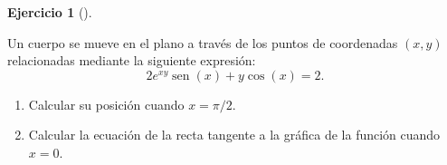 \documentclass[
  a4paper,
]{scrreport}
\providecommand{\tightlist}{%
  \setlength{\itemsep}{0pt}\setlength{\parskip}{0pt}}\usepackage{longtable,booktabs,array}
\theoremstyle{definition}
\newtheorem{exercise}{Ejercicio}[chapter]
\theoremstyle{remark}
\begin{document}
\begin{exercise}[]\protect\hypertarget{exr-derivada-implicita-3}{}\label{exr-derivada-implicita-3}

Un cuerpo se mueve en el plano a través de los puntos de coordenadas
\((x,y)\) relacionadas mediante la siguiente expresión: \[
2e^{xy} \operatorname{sen}(x) + y\cos(x) = 2.
\]

\begin{enumerate}
\def\labelenumi{\alph{enumi}.}
\tightlist
\item
  Calcular su posición cuando \(x=\pi/2\).
\item
  Calcular la ecuación de la recta tangente a la gráfica de la función
  cuando \(x=0\).
\end{enumerate}

\end{exercise}
\end{document}

